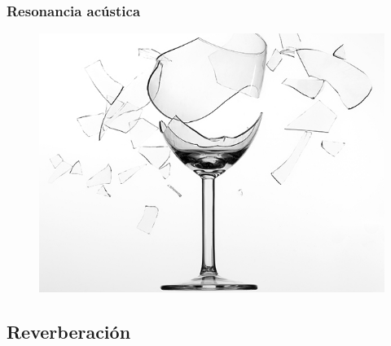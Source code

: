 \documentclass[14pt]{beamer}
\begin{document}
\begin{frame}
\frametitle{Resonancia acústica}
\begin{figure}
    \centering
    \includegraphics[scale=0.4]{Imagenes/Resonancia_03.jpg}
\end{figure}
\end{frame}

\subsection{Reverberación}
\end{document}
